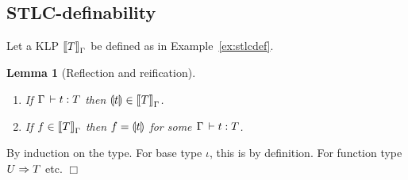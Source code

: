 \documentclass[a4paper]{article}
\newtheorem{lemma}[theorem]{Lemma}
\def\squareforqed{\ensuremath{\Box}}
\def\qed{\ifmmode\squareforqed\else{\unskip\nobreak\hfil
\penalty50\hskip1em\null\nobreak\hfil\squareforqed
\parfillskip=0pt\finalhyphendemerits=0\endgraf}\fi}
\newenvironment{proof*}[1][]{\noindent\ifthenelse{\equal{#1}{}}{{\it
      Proof.}}{{\it Proof #1.}}\hspace{2ex}}{\bigskip}
\begin{document}
\subsection{STLC-definability}

Let a KLP $\mathopen{{[\kern-0.14em[}} T \mathclose{{]\kern-0.14em]}}_{\Gamma}$ be defined as in Example~\ref{ex:stlcdef}.
\begin{lemma}[Reflection and reification]\bla
  \begin{enumerate}
  \item If $\Gamma \,\vdash t : T$ then $\llparenthesis t\rrparenthesis \in \mathopen{{[\kern-0.14em[}} T \mathclose{{]\kern-0.14em]}}_{\Gamma}$.
  \item If $f \in \mathopen{{[\kern-0.14em[}} T \mathclose{{]\kern-0.14em]}}_{\Gamma}$ then $f = \llparenthesis t\rrparenthesis$ for some $\Gamma
    \,\vdash t : T$.
  \end{enumerate}
\end{lemma}
\begin{proof*}
  By induction on the type.  For base type $\iota$, this is by definition.
  For function type $U \Rightarrow T$ etc.
\qed
\end{proof*}



\end{document}
